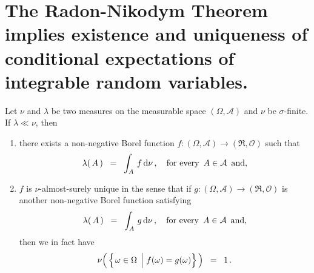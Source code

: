 

\section{The Radon-Nikodym Theorem implies existence and uniqueness of conditional expectations of integrable random variables.}
\setcounter{theorem}{0}
\setcounter{equation}{0}

\renewcommand{\theenumi}{\roman{enumi}}
\renewcommand{\labelenumi}{\textnormal{(\theenumi)}$\;\;$}


\begin{theorem}
\label{Thm:RadonNikodym}
\mbox{}
\vskip 0.2cm
\noindent
Let $\nu$ and $\lambda$ be two measures on the measurable space
$(\Omega,\mathcal{A})$ and $\nu$ be $\sigma$-finite.
If $\lambda \ll \nu$, then
\begin{enumerate}
\item
	there exists a non-negative Borel function
	$f : (\Omega,\mathcal{A}) \longrightarrow (\Re,\mathcal{O})$
	such that
	\begin{equation*}
	\lambda(\,A\,)
	\;\; = \;\;
		\int_{A}\, f \,\textnormal{d}\nu\,,
	\quad
	\textnormal{for every \,$A\in\mathcal{A}$\, and},
	\end{equation*}
\item
	$f$ is $\nu$-almost-surely unique in the sense that if
	$g : (\Omega,\mathcal{A}) \longrightarrow (\Re,\mathcal{O})$
	is another non-negative Borel function satisfying
	\begin{equation*}
	\lambda(\,A\,)
	\;\; = \;\;
		\int_{A}\, g \,\textnormal{d}\nu\,,
	\quad
	\textnormal{for every \,$A\in\mathcal{A}$\, and},
	\end{equation*}
	then we in fact have
	\begin{equation*}
	\nu\!\left(\,\left\{\left.\omega\overset{{\color{white}.}}{\in}\Omega\;\,\right\vert\,f(\omega) = g(\omega)\right\}\,\right) \;\;=\;\; 1\,.
	\end{equation*}
\end{enumerate}
\end{theorem}

